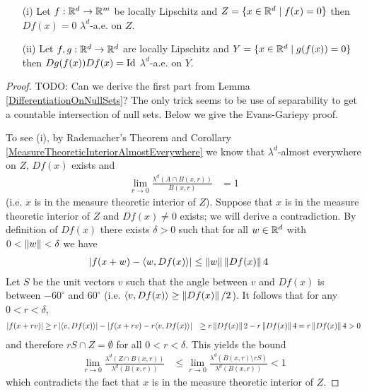 \begin{lem}\label{DifferentiationOfInversesLipschitz}
\begin{itemize}
\item[(i)] Let $f : \mathbb{R}^d \to \mathbb{R}^m$ be locally Lipschitz and $Z = \lbrace x \in \mathbb{R}^d \mid f(x) = 0 \rbrace$ then $Df(x) = 0$ $\lambda^d$-a.e. on $Z$.
\item[(ii)] Let $f,g : \mathbb{R}^d \to \mathbb{R}^d$ are locally Lipschitz and $Y = \lbrace x \in \mathbb{R}^d \mid g(f(x)) = 0 \rbrace$ then $Dg(f(x)) Df(x) = \operatorname*{Id}$ $\lambda^d$-a.e. on $Y$.
\end{itemize}
\end{lem}
\begin{proof}
TODO: Can we derive the first part from Lemma \ref{DifferentiationOnNullSets}?  The only trick seems to be use of separability to get a countable intersection of null sets.  Below we give the Evans-Gariepy proof.

To see (i), by Rademacher's Theorem and Corollary \ref{MeasureTheoreticInteriorAlmostEverywhere} we know that $\lambda^d$-almost everywhere on $Z$, $Df(x)$ exists and 
\begin{align*}
\lim_{r \to 0} \frac{\lambda^d(A \cap B(x,r))}{B(x,r)} &= 1
\end{align*}
(i.e. $x$ is in the measure theoretic interior of $Z$).  Suppose that $x$ is in the measure theoretic interior of $Z$ and $Df(x) \neq 0$ exists; we will derive a contradiction.  By definition of $Df(x)$   there exists $\delta>0$ such that for all $w \in \mathbb{R}^d$ with $0 < \left \lVert w \right \rVert < \delta$ we have
\begin{align*}
\left \vert f(x + w) - \langle w, Df(x) \rangle \right \vert &\leq \left \lVert w \right \rVert \left \lVert Df(x) \right \rVert{4} 
\end{align*}
Let $S$ be the unit vectors $v$ such that the angle between $v$ and $Df(x)$ is between $-60^\circ$ and $60^\circ$ (i.e. $\langle v, Df(x) \rangle \geq \left \lVert Df(x) \right \rVert/2$).  It follows that
for any $0 < r < \delta$,
\begin{align*}
\left \vert f(x+rv) \right \vert &\geq r \left \vert \langle v, Df(x) \rangle \right \vert - \left \vert f(x + rv) - r \langle v, Df(x) \rangle \right \vert &\geq r \left \lVert Df(x) \right \rVert{2} - r \left \lVert Df(x) \right \rVert{4} = r \left \lVert Df(x) \right \rVert{4} > 0
\end{align*}
and therefore $r S \cap Z = \emptyset$ for all $0 < r < \delta$.  This yields the bound
\begin{align*}
\lim_{r \to 0} \frac{\lambda^d(Z \cap B(x,r))}{\lambda^d(B(x,r))} &\leq \lim_{r \to 0} \frac{\lambda^d(B(x,r) \setminus rS)}{\lambda^d(B(x,r))} < 1
\end{align*}
which contradicts the fact that $x$ is in the measure theoretic interior of $Z$.


\end{proof}
